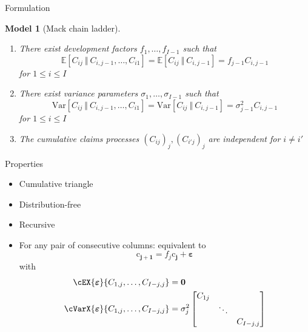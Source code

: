 \documentclass[tikz]{beamer}
\newtheorem{model}{Model}
\begin{document}
\begin{frame}{Formulation}
  \small
  \begin{model}[Mack chain ladder]
    \begin{enumerate}
      \item There exist development factors $f_1, \dots, f_{I - 1}$ such that
            \begin{equation*}
              \mathbb{E}[C_{ij} \ \Vert \ C_{i, j - 1}, \dots, C_{i1}] = \mathbb{E}[C_{ij} \ \Vert \ C_{i, j - 1}] = f_{j - 1} C_{i, j - 1}
            \end{equation*}
            for $1 \leq i \leq I$
      \item There exist variance parameters $\sigma_1, \dots, \sigma_{I - 1}$ such that
            \begin{equation*}
              \mathrm{Var}[C_{ij} \ \Vert \ C_{i, j - 1}, \dots, C_{i1}] = \mathrm{Var}[C_{ij} \ \Vert \ C_{i, j - 1}] = \sigma_{j - 1}^2 C_{i, j - 1}
            \end{equation*}
            for $1 \leq i \leq I$
      \item The cumulative claims processes $(C_{ij})_j, (C_{i'j})_j$ are independent for $i \neq i'$
    \end{enumerate}
  \end{model}
\end{frame}

\begin{frame}{Properties}
  \begin{itemize}
    \item Cumulative triangle
    \item Distribution-free
    \item Recursive
    \item For any pair of consecutive columns: equivalent to
          \begin{equation*}
            \bm{\mathrm{c}_{j + 1}} = f_j \bm{\mathrm{c}_j} + \bm{\varepsilon}
          \end{equation*}
          with
          \begin{align*}
            \cEX{\bm{\varepsilon}}{C_{1, j}, \dots, C_{I - j, j}}   & = \bm{0}     \\
            \cVarX{\bm{\varepsilon}}{C_{1, j}, \dots, C_{I - j, j}} & = \sigma^2_j
            \begin{bmatrix}
              C_{1j} &        &              \\
                     & \ddots &              \\
                     &        & C_{I - j, j}
            \end{bmatrix}
          \end{align*}
  \end{itemize}
\end{frame}
\end{document}
